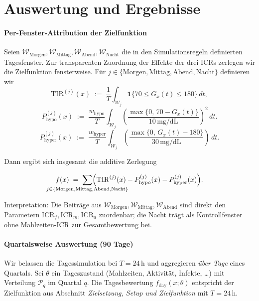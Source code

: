 \documentclass[ngerman,a4paper,12pt,pdftex]{article}
\newcommand{\Ind}{\mathbf{1}}
\newcommand{\Hhypo}{10\,\mathrm{mg/dL}}
\newcommand{\Hhyper}{30\,\mathrm{mg/dL}}
\newcommand{\ICRf}{\mathrm{ICR}_f}
\newcommand{\ICRm}{\mathrm{ICR}_m}
\newcommand{\ICRa}{\mathrm{ICR}_a}
\begin{document}
\newcommand{\Hgate}{60\,\mathrm{min}}             %
\newcommand{\Kg}{K_{\mathrm{gate}}}               %
\newcommand{\gammalow}{\gamma_{\mathrm{low}}}     %

\section{Auswertung und Ergebnisse}

\paragraph{Per-Fenster-Attribution der Zielfunktion}
Seien \(\mathcal W_{\mathrm{Morgen}}, \mathcal W_{\mathrm{Mittag}}, \mathcal W_{\mathrm{Abend}}, \mathcal W_{\mathrm{Nacht}}\) die in den Simulationsregeln definierten Tagesfenster. Zur transparenten Zuordnung der Effekte der drei ICRs zerlegen wir die Zielfunktion fensterweise. Für \(j\in\{\mathrm{Morgen},\mathrm{Mittag},\mathrm{Abend},\mathrm{Nacht}\}\) definieren wir
\[
\mathrm{TIR}^{(j)}(x)\;:=\;\frac{1}{T}\int_{\mathcal W_j} \Ind\{70\le G_x(t)\le 180\}\,dt,
\]
\[
P_{\mathrm{hypo}}^{(j)}(x)\;:=\;\frac{w_{\mathrm{hypo}}}{T}\int_{\mathcal W_j}\!\left(\frac{\max\{0,\,70-G_x(t)\}}{\Hhypo}\right)^{\!2}\, dt.
\]
\[
P_{\mathrm{hyper}}^{(j)}(x)\;:=\;\frac{w_{\mathrm{hyper}}}{T}\int_{\mathcal W_j}\!\left(\frac{\max\{0,\,G_x(t)-180\}}{\Hhyper}\right)\, dt.
\]
\medskip

\noindent Dann ergibt sich insgesamt die additive Zerlegung

\newcommand{\Jfen}{\{\mathrm{Morgen},\mathrm{Mittag},\mathrm{Abend},\mathrm{Nacht}\}}
\[
f(x) \;=\; \sum_{\mathclap{j\in\Jfen}}\Bigl(\mathrm{TIR}^{(j)}(x) - P_{\mathrm{hypo}}^{(j)}(x) - P_{\mathrm{hyper}}^{(j)}(x)\Bigr).
\]
\medskip

\noindent Interpretation: Die Beiträge aus \(\mathcal W_{\mathrm{Morgen}},\mathcal W_{\mathrm{Mittag}},\mathcal W_{\mathrm{Abend}}\) sind direkt den Parametern \(\ICRf,\ICRm,\ICRa\) zuordenbar; die Nacht trägt als Kontrollfenster ohne Mahlzeiten-ICR zur Gesamtbewertung bei.
\medskip
\paragraph{Quartalsweise Auswertung (90 Tage)}
Wir belassen die Tagessimulation bei \(T=24\,\mathrm{h}\) und aggregieren \emph{über Tage} eines Quartals. Sei \(\theta\) ein Tageszustand (Mahlzeiten, Aktivität, Infekte, \ldots) mit Verteilung \(\mathcal P_q\) im Quartal \(q\). Die Tagesbewertung \(f_{\text{day}}(x;\theta)\) entspricht der Zielfunktion aus Abschnitt \emph{Zielsetzung, Setup und Zielfunktion} mit \(T=24\,\mathrm{h}\).
\end{document}
